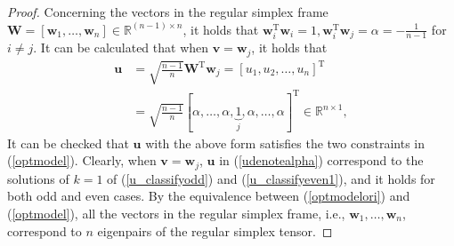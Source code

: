 \begin{proof}	
	Concerning  the   vectors   in the regular simplex  frame
 $
 \mathbf W =
 [
 \mathbf{w}_{1}, \ldots, \mathbf{w}_{n}
 ] \in
  \mathbb{R}^{(n-1) \times  n}$, 
  it holds that 
 $ \mathbf{w}_{i}^{\mathrm T} \mathbf{w}_{i} =1, 
  \mathbf{w}_{i}^{\mathrm T} \mathbf{w}_{j} = \alpha = -\frac{1}{n-1} $
  for 
  $ i \neq j$. 
  It can be calculated that  when 
  $ \mathbf v = \mathbf w_{j}$,
  it holds that 
 \begin{align}\label{udenotealpha}
\mathbf   u 
& 
\nonumber =
\sqrt {
	\frac  {n-1}{ n}
}   
{\mathbf W}^{\mathrm T}  {\mathbf w_{j}}  
= 
[u_1,u_2,\dots, u_{n}]^{\mathrm T} 
\\
&=
\sqrt {
	\frac  {n-1}{ n}
} 
[\alpha,  \dots,   \alpha, 
\underbrace{ 1 }_{j}, \alpha,  \dots,  \alpha ]^{\mathrm T} 
\in  \mathbb {R}^{n \times 1} ,
\end{align} 
It can be checked that 
$\mathbf u$ with the above form satisfies the two constraints  in (\ref{optmodel}).
Clearly,  
when $ \mathbf v = \mathbf w_{j}$,
$\mathbf u$  in   (\ref{udenotealpha}) 
correspond to the solutions  of   $k=1$ of 
(\ref{u_classifyodd})  and (\ref{u_classifyeven1}), and 
it holds for both odd  and even cases.
By  the equivalence  between  (\ref{optmodelori}) and  (\ref{optmodel}),
all  the 	  vectors   in the regular simplex  frame, i.e., 
$ \mathbf{w}_{1}, \ldots, \mathbf{w}_{n}$,
correspond  to 
$n$
eigenpairs  of the regular simplex  tensor. 
\end{proof} 
